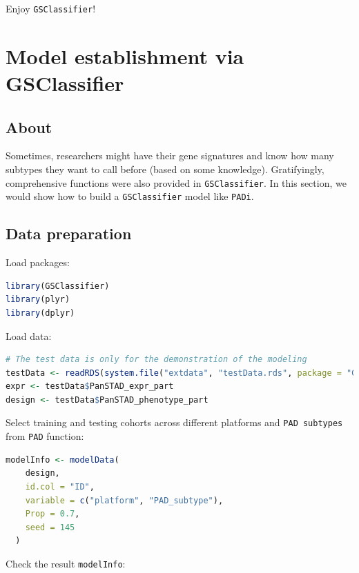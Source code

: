 \documentclass[
  12pt,
]{book}
\newcommand{\passthrough}[1]{#1}
\begin{document}
Enjoy \passthrough{\lstinline!GSClassifier!}!

\hypertarget{model-establishment-via-gsclassifier}{%
\chapter{Model establishment via GSClassifier}\label{model-establishment-via-gsclassifier}}

\hypertarget{about-2}{%
\section{About}\label{about-2}}

Sometimes, researchers might have their gene signatures and know how many subtypes they want to call before (based on some knowledge). Gratifyingly, comprehensive functions were also provided in \passthrough{\lstinline!GSClassifier!}. In this section, we would show how to build a \passthrough{\lstinline!GSClassifier!} model like \passthrough{\lstinline!PADi!}.

\hypertarget{data-preparation}{%
\section{Data preparation}\label{data-preparation}}

Load packages:

\begin{lstlisting}[language=R]
library(GSClassifier)
library(plyr)
library(dplyr)
\end{lstlisting}

Load data:

\begin{lstlisting}[language=R]
# The test data is only for the demonstration of the modeling
testData <- readRDS(system.file("extdata", "testData.rds", package = "GSClassifier"))
expr <- testData$PanSTAD_expr_part
design <- testData$PanSTAD_phenotype_part
\end{lstlisting}

Select training and testing cohorts across different platforms and \passthrough{\lstinline!PAD subtypes!} from \passthrough{\lstinline!PAD!} function:

\begin{lstlisting}[language=R]
modelInfo <- modelData(
    design,
    id.col = "ID",
    variable = c("platform", "PAD_subtype"),
    Prop = 0.7,
    seed = 145
  )
\end{lstlisting}

Check the result \passthrough{\lstinline!modelInfo!}:
\end{document}
